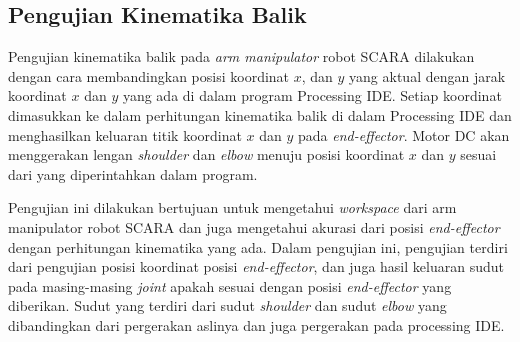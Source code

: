 \subsection{Pengujian Kinematika Balik}
Pengujian kinematika balik pada \textit{arm manipulator} robot SCARA dilakukan dengan cara membandingkan posisi koordinat $x$, dan $y$ yang aktual dengan jarak koordinat $x$ dan $y$ yang ada di dalam program Processing IDE. Setiap koordinat dimasukkan ke dalam perhitungan kinematika balik di dalam Processing IDE dan menghasilkan keluaran titik koordinat $x$ dan $y$ pada \textit{end-effector}. Motor DC akan menggerakan lengan \textit{shoulder} dan \textit{elbow} menuju posisi koordinat $x$ dan $y$ sesuai dari yang diperintahkan dalam program.

 Pengujian ini dilakukan bertujuan untuk mengetahui \textit{workspace} dari arm manipulator robot SCARA dan juga mengetahui akurasi dari posisi \textit{end-effector} dengan perhitungan kinematika yang ada.
Dalam pengujian ini, pengujian terdiri dari pengujian posisi koordinat posisi \textit{end-effector}, dan juga hasil keluaran sudut pada masing-masing \textit{joint} apakah sesuai dengan posisi \textit{end-effector} yang diberikan. Sudut yang terdiri dari sudut \textit{shoulder} dan sudut \textit{elbow} yang dibandingkan dari pergerakan aslinya dan juga pergerakan pada processing IDE.  

